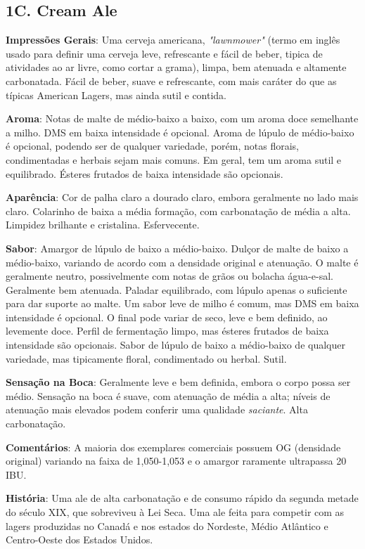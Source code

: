 \subsection*{1C. Cream Ale}
\textbf{Impressões Gerais}: Uma cerveja americana, \textit{"lawnmower"} (termo em inglês usado para definir uma cerveja leve, refrescante e fácil de beber, tipica de atividades ao ar livre, como cortar a grama), limpa, bem atenuada e altamente carbonatada. Fácil de beber, suave e refrescante, com mais caráter do que as típicas American Lagers, mas ainda sutil e contida.

\textbf{Aroma}: Notas de malte de médio-baixo a baixo, com um aroma doce semelhante a milho. DMS em baixa intensidade é opcional. Aroma de lúpulo de médio-baixo é opcional, podendo ser de qualquer variedade, porém, notas florais, condimentadas e herbais sejam mais comuns. Em geral, tem um aroma sutil e equilibrado. Ésteres frutados de baixa intensidade são opcionais.

\textbf{Aparência}: Cor de palha claro a dourado claro, embora geralmente no lado mais claro. Colarinho de baixa a média formação, com carbonatação de média a alta. Limpidez brilhante e cristalina. Esfervecente.

\textbf{Sabor}: Amargor de lúpulo de baixo a médio-baixo. Dulçor de malte de baixo a médio-baixo, variando de acordo com a densidade original e atenuação. O malte é geralmente neutro, possivelmente com notas de grãos ou bolacha água-e-sal. Geralmente bem atenuada. Paladar equilibrado, com lúpulo apenas o suficiente para dar suporte ao malte. Um sabor leve de milho é comum, mas DMS em baixa intensidade é opcional. O final pode variar de seco, leve e bem definido, ao levemente doce. Perfil de fermentação limpo, mas ésteres frutados de baixa intensidade são opcionais. Sabor de lúpulo de baixo a médio-baixo de qualquer variedade, mas tipicamente floral, condimentado ou herbal. Sutil.

\textbf{Sensação na Boca}: Geralmente leve e bem definida, embora o corpo possa ser médio. Sensação na boca é suave, com atenuação de média a alta; níveis de atenuação mais elevados podem conferir uma qualidade \textit{saciante}. Alta carbonatação.

\textbf{Comentários}: A maioria dos exemplares comerciais possuem OG (densidade original) variando na faixa de 1,050-1,053 e o amargor raramente ultrapassa 20 IBU.

\textbf{História}: Uma ale de alta carbonatação e de consumo rápido da segunda metade do século XIX, que sobreviveu à Lei Seca. Uma ale feita para competir com as lagers produzidas no Canadá e nos estados do Nordeste, Médio Atlântico e Centro-Oeste dos Estados Unidos.

